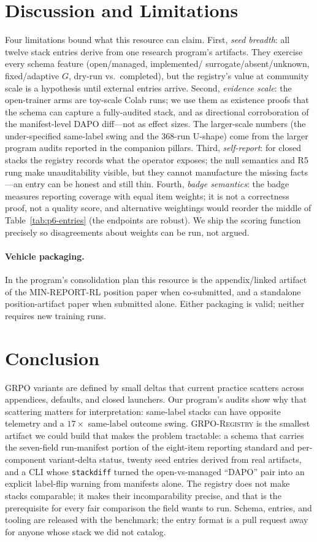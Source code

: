 \documentclass{article}
\begin{document}
 \section{Discussion and Limitations}
\label{sec:p6-discussion}
Four limitations bound what this resource can claim. First, \emph{seed
breadth}: all twelve stack entries derive from one research program's
artifacts. They exercise every schema feature (open/managed, implemented/
surrogate/absent/unknown, fixed/adaptive $G$, dry-run vs.\ completed), but the
registry's value at community scale is a hypothesis until external entries
arrive. Second, \emph{evidence scale}: the open-trainer arms are toy-scale
Colab runs; we use them as existence proofs that the schema can capture a
fully-audited stack, and as directional corroboration of the manifest-level
DAPO diff---not as effect sizes. The larger-scale numbers (the under-specified
same-label swing and the 368-run U-shape) come from the larger program audits
reported in the companion pillars. Third, \emph{self-report}: for closed
stacks the registry records what the operator exposes; the null semantics and
R5 rung make unauditability visible, but they cannot manufacture the missing
facts---an entry can be honest and still thin. Fourth, \emph{badge
semantics}: the badge measures reporting coverage with equal item weights; it
is not a correctness proof, not a quality score, and alternative weightings
would reorder the middle of Table~\ref{tab:p6-entries} (the endpoints are
robust). We ship the scoring function precisely so disagreements about
weights can be run, not argued.
\paragraph{Vehicle packaging.}
In the program's consolidation plan this resource is the appendix/linked
artifact of the MIN-REPORT-RL position paper when co-submitted, and a
standalone position-artifact paper when submitted alone. Either packaging is
valid; neither requires new training runs.

\section{Conclusion}
\label{sec:p6-conclusion}
GRPO variants are defined by small deltas that current practice scatters
across appendices, defaults, and closed launchers. Our program's audits show
why that scattering matters for interpretation: same-label stacks can have
opposite telemetry and a $17\times$ same-label outcome swing.
\textsc{GRPO-Registry} is the smallest artifact we could build that makes the
problem tractable: a schema that
carries the seven-field run-manifest portion of the eight-item reporting
standard and per-component
variant-delta status, twenty seed entries derived from real artifacts, and a
CLI whose \texttt{stackdiff} turned the open-vs-managed ``DAPO'' pair into an
explicit label-flip warning from manifests alone. The registry does not make
stacks comparable; it makes their incomparability precise, and that is the
prerequisite for every fair comparison the field wants to run. Schema,
entries, and tooling are released with the benchmark; the entry format is a
pull request away for anyone whose stack we did not catalog.
 \appendix
\end{document}
